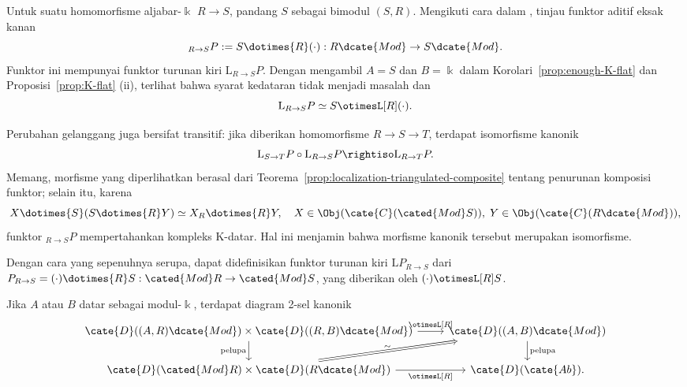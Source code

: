 \begin{contoh}\label{eg:change-of-rings}
	Untuk suatu homomorfisme aljabar-$\Bbbk$ $R\to S$, pandang $S$ sebagai
	bimodul $(S,R)$. Mengikuti cara dalam \cite[Korolari 6.6.8]{Li1}, tinjau
	funktor aditif eksak kanan
	\begin{equation*}
		{}_{R \to S} P := S \dotimes{R} (\cdot): R\dcate{Mod} \to S\dcate{Mod} .
	\end{equation*}
	Funktor ini mempunyai funktor turunan kiri $\mathrm{L}{}_{R\to S}P$.
	Dengan mengambil $A=S$ dan $B=\Bbbk$ dalam
	Korolari~\ref{prop:enough-K-flat} dan Proposisi~\ref{prop:K-flat} (ii),
	terlihat bahwa syarat kedataran tidak menjadi masalah dan
	\[ \mathrm{L}{}_{R \to S} P \simeq S \otimesL[R] (\cdot) . \]

	Perubahan gelanggang juga bersifat transitif: jika diberikan homomorfisme
	$R\to S\to T$, terdapat isomorfisme kanonik
	\[ \mathrm{L} {}_{S \to T} P \circ \mathrm{L} {}_{R \to S} P \rightiso \mathrm{L} {}_{R \to T} P. \]
	Memang, morfisme yang diperlihatkan berasal dari
	Teorema~\ref{prop:localization-triangulated-composite} tentang penurunan
	komposisi funktor; selain itu, karena
	\[ X \dotimes{S} (S \dotimes{R} Y) \simeq X_R \dotimes{R} Y, \quad X \in \Obj(\cate{C}(\cated{Mod}S)), \; Y \in \Obj(\cate{C}(R\dcate{Mod})), \]
	funktor ${}_{R\to S}P$ mempertahankan kompleks K-datar. Hal ini menjamin
	bahwa morfisme kanonik tersebut merupakan isomorfisme.

	Dengan cara yang sepenuhnya serupa, dapat didefinisikan funktor turunan kiri
	$\mathrm{L}P_{R\to S}$ dari
	$P_{R\to S}=(\cdot)\dotimes{R}S:\cated{Mod}R\to\cated{Mod}S$, yang diberikan
	oleh $(\cdot)\otimesL[R]S$.
\end{contoh}

\begin{proposisi}\label{prop:otimesL-enrichment}
	Jika $A$ atau $B$ datar sebagai modul-$\Bbbk$, terdapat diagram 2-sel
	kanonik
	\[\begin{tikzcd}
		\cate{D}((A, R)\dcate{Mod}) \times \cate{D}((R, B)\dcate{Mod}) \arrow[r, "{\otimesL[R]}"] \arrow[d, "\text{pelupa}"'] & \cate{D}((A, B)\dcate{Mod}) \arrow[d, "\text{pelupa}"] \\
		\cate{D}(\cated{Mod}R) \times \cate{D}(R\dcate{Mod}) \arrow[r, "{\otimesL[R]}"'] \arrow[Rightarrow, ru, "\sim", sloped] & \cate{D}(\cate{Ab}) .
	\end{tikzcd}\]
\end{proposisi}

